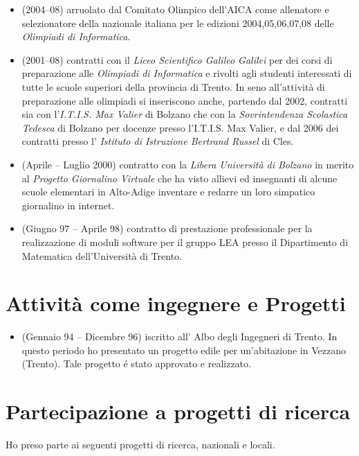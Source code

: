 \documentclass[11pt]{article}
\begin{document}
\begin{itemize}
\item[] (2004--08) arruolato dal Comitato Olimpico dell'AICA
come allenatore e selezionatore
della nazionale italiana per le edizioni 2004,05,06,07,08
delle {\em Olimpiadi di Informatica}.

\item[] (2001--08)
contratti con il {\em Liceo Scientifico Galileo Galilei}
per dei corsi di preparazione alle {\em Olimpiadi di Informatica}
e rivolti agli studenti interessati
di tutte le scuole superiori della provincia di Trento.
In seno all'attivit\`a di preparazione alle olimpiadi
si inseriscono anche,
partendo dal 2002, contratti
sia con l'{\em I.T.I.S.
Max Valier} di Bolzano che
con la {\em Sovrintendenza Scolastica Tedesca} di Bolzano
per docenze presso l'I.T.I.S.
Max Valier,
e dal 2006 dei contratti presso l'
{\em Istituto di Istruzione Bertrand Russel} di Cles.

\item[] (Aprile -- Luglio 2000)
     contratto con la {\em Libera Universit\`a di Bolzano}
     in merito al {\em Progetto Giornalino Virtuale}
     che ha visto allievi ed insegnanti di alcune scuole elementari
     in Alto-Adige
     inventare e redarre un loro simpatico giornalino in internet.
\item[] (Giugno 97 -- Aprile 98)
     contratto di prestazione professionale
     per la realizzazione di moduli software per il gruppo LEA
     presso il Dipartimento di Matematica dell'Universit\`a di Trento.
\end{itemize}


\section{Attivit\`a come ingegnere e Progetti}
\begin{itemize}
\item[] (Gennaio 94 -- Dicembre 96)
     iscritto all' Albo degli Ingegneri di Trento.
     In questo periodo ho presentato un progetto edile
     per un'abitazione in Vezzano (Trento).
     Tale progetto \'e stato approvato e realizzato.
\end{itemize}

\section{Partecipazione a progetti di ricerca}
   Ho preso parte ai seguenti progetti di ricerca,
   nazionali e locali.
\end{document}
